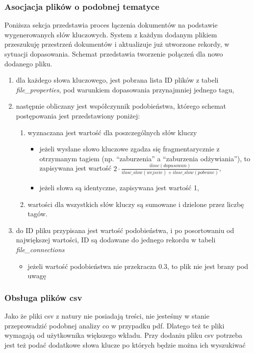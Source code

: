 \documentclass[12pt,a4paper,twoside]{article}
\begin{document}
\subsubsection{Asocjacja plików o podobnej tematyce}
Poniższa sekcja przedstawia proces łączenia dokumentów na podstawie wygenerowanych słów kluczowych. System z każdym dodanym plikiem przeszukuję przestrzeń dokumentów i aktualizuje już utworzone rekordy, w sytuacji dopasowania. Schemat przedstawia tworzenie połączeń dla nowo dodanego pliku.
\begin{enumerate}
\item dla każdego słowa kluczowego, jest pobrana lista ID plików z tabeli \textit{file\_properties}, pod warunkiem dopasowania przynajmniej jednego tagu,
\item następnie obliczany jest współczynnik podobieństwa, którego schemat postępowania jest przedstawiony poniżej:
	\begin{enumerate}
		\item wyznaczana jest wartość dla poszczególnych słów kluczy
		\begin{itemize}
			\item jeżeli wysłane słowo kluczowe zgadza się fragmentarycznie z otrzymanym tagiem (np. ``zaburzenia'' a ``zaburzenia odżywiania''), to zapisywana jest wartość $2\cdot\frac{ilosc(dopasowan)}{ilosc\_slow(wejscie)+ilosc\_slow(pobrane)}$,
			\item jeżeli słowa są identyczne, zapisywana jest wartość 1,
		\end{itemize}
		\item wartości dla wszystkich słów kluczy są sumowane i dzielone przez liczbę tagów.
	\end{enumerate}
\item do ID pliku przypisana jest wartość podobieństwa, i po posortowaniu od największej wartości, ID są dodawane do jednego rekordu w tabeli \textit{file\_connections}
	\begin{itemize}
		\item jeżeli wartość podobieństwa nie przekracza 0.3, to plik nie jest brany pod uwagę
	\end{itemize}
\end{enumerate}
\subsubsection{Obsługa plików csv}
Jako że pliki csv z natury nie posiadają treści, nie jesteśmy w stanie przeprowadzić podobnej analizy co w przypadku pdf. Dlatego też te pliki wymagają od użytkownika większego wkładu. Przy dodaniu pliku csv potrzeba jest też podać dodatkowe słowa klucze po których będzie można ich wyszukiwać
\end{document}
